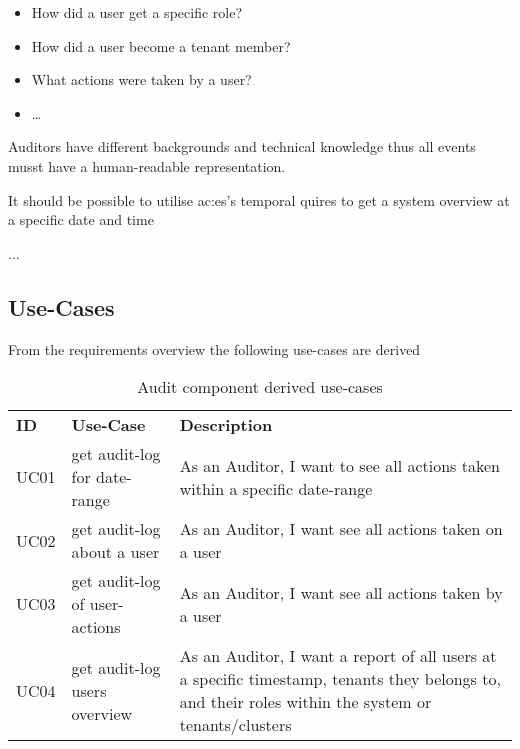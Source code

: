 \begin{itemize}
  \item How did a user get a specific role?
  \item How did a user become a tenant member?
  \item What actions were taken by a user?
  \item \dots
\end{itemize}

Auditors have different backgrounds and technical knowledge thus all events musst have a human-readable representation.

It should be possible to utilise \gls{ac:es}'s temporal quires  to get a system overview at a specific date and time 

...~\citep{SAIP}

\subsection{Use-Cases}

From the requirements overview the following use-cases are derived

\begin{table}[H]
  \begin{center}
    \caption{Audit component derived use-cases}
    \label{tab:acuc}
    \def\arraystretch{1.5}
    \begin{tabularx}{\linewidth}{|l l X |}
      \hline
      \rowcolor{gray!20}
      \textbf{ID} & \textbf{Use-Case} & \textbf{Description}\\
      UC01 & get audit-log for date-range & As an Auditor, I want to see all actions taken within a specific date-range\\
      UC02 & get audit-log about a user & As an Auditor, I want see all actions taken on a user\\
      UC03 & get audit-log of user-actions & As an Auditor, I want see all actions taken by a user\\
      UC04 & get audit-log users overview & As an Auditor, I want a report of all users at a specific timestamp, tenants they belongs to, and their roles within the system or tenants/clusters\\
      \hline
    \end{tabularx}
  \end{center}
\end{table}


